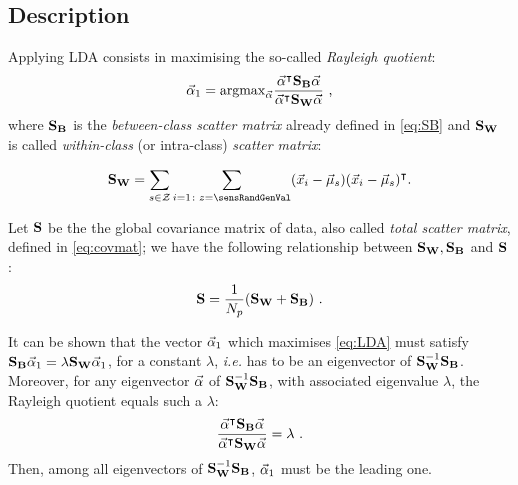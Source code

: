 \subsection{Description} Applying LDA consists in maximising the so-called {\em Rayleigh quotient}:
 \begin{equation}\label{eq:LDA}
 \vec{\alpha}_1=\mathrm{argmax}_{\vec{\alpha}} \frac{\vec{\alpha}^\intercal \textbf{S}_{\textbf{B}} \vec{\alpha}}{\vec{\alpha}^\intercal \textbf{S}_{\textbf{W}} \vec{\alpha}} \mbox{ ,}
 \end{equation}
where $\textbf{S}_{\textbf{B}}$ is the {\em between-class scatter matrix} already defined in \eqref{eq:SB} and $\textbf{S}_{\textbf{W}}$ is called 
{\em within-class} (or intra-class) {\em scatter matrix}:

\begin{equation}
\SW = \sum_{\sensVarGenValue\in\sensVarSet}\sum_{i=1\colon \sensVar=\sensRandGenVal}(\vLeakVec_i-\mmmXclass)(\vLeakVec_i-\mmmXclass)^\intercal \mbox{.}
\end{equation}


\begin{remark}
Let $\textbf{S}$ be the the global covariance matrix of data, also called {\em total scatter matrix}, defined in \eqref{eq:covmat}; we have the following relationship between $\textbf{S}_{\textbf{W}},\textbf{S}_{\textbf{B}}$ and $\textbf{S}$:
\begin{equation}
\textbf{S} = \frac{1}{N_p}(\textbf{S}_{\textbf{W}} + \textbf{S}_{\textbf{B}}) \mbox{ .}
\end{equation}
\end{remark}

It can be shown that the vector $\vec{\alpha}_1$ which maximises \eqref{eq:LDA} must satisfy $\textbf{S}_{\textbf{B}}\vec{\alpha}_1 = \lambda \textbf{S}_{\textbf{W}} \vec{\alpha}_1$, for a constant $\lambda$, \textit{i.e.} has to be an eigenvector of $\textbf{S}_{\textbf{W}}^{-1} \textbf{S}_{\textbf{B}}$. Moreover, for any eigenvector $\vec{\alpha}$ of $\textbf{S}_{\textbf{W}}^{-1}\textbf{S}_{\textbf{B}}$, with associated eigenvalue $\lambda$, the Rayleigh quotient equals such a $\lambda$:
\begin{equation}\label{eq:lambdas}
\frac{\vec{\alpha}^\intercal \textbf{S}_{\textbf{B}} \vec{\alpha}}{\vec{\alpha}^\intercal \textbf{S}_{\textbf{W}} \vec{\alpha}} = \lambda \mbox{ .}
\end{equation}
Then, among all eigenvectors of $\textbf{S}_{\textbf{W}}^{-1} \textbf{S}_{\textbf{B}}$, $\vec{\alpha}_1$ must be the leading one. \\

